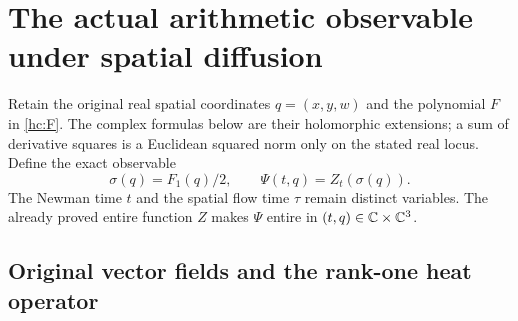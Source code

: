 \section{The actual arithmetic observable under spatial diffusion}
\label{sec:eo}

Retain the original real spatial coordinates $q=(x,y,w)$ and the
polynomial $F$ in \eqref{hc:F}. The complex formulas below are their
holomorphic extensions; a sum of derivative squares is a Euclidean
squared norm only on the stated real locus. Define the exact observable
\[
\sigma(q)=F_1(q)/2,\qquad \Psi(t,q)=Z_t(\sigma(q)).
\]
The Newman time $t$ and the spatial flow time $\tau$ remain distinct
variables. The already proved entire function $Z$ makes $\Psi$ entire
in $(t,q)\in\mathbb C\times\mathbb C^3$.

\subsection{Original vector fields and the rank-one heat operator}

